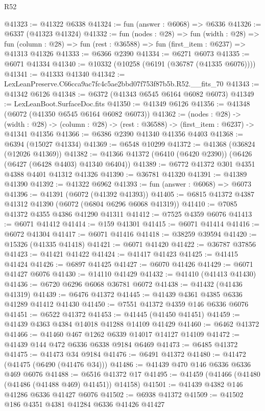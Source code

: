\begin{lexlean}{R52}
\begin{coremodule}
@41323 := @41322 @6338
@41324 := fun (answer : @6068) => @6336
@41326 := @6337 (@41323 @41324)
@41332 := fun (nodes : @28) =>
  fun (width : @28) =>
  fun (column : @28) => fun (rest : @36588) => fun (first_item : @6237) => @41313 @41326
@41333 := @6366 @2390
@41334 := @6271 @6073
@41335 := @6071 @41334
@41340 := @10332 (@10258 (@6191 (@36787 (@41335 @6076))))
@41341 := @41333 @41340
@41342 := LexLeanPreserve.C66cca9ac7fc4c5ae2bbd07f753f87b5b.R52.__fits_70
@41343 := @41342 @6126
@41348 := @6372 (@41343 @6545 @6164 @6082 @6073)
@41349 := LexLeanBoot.SurfaceDoc.fits
@41350 := @41349 @6126
@41356 := @41348 (@6072 (@41350 @6545 @6164 @6082 @6073))
@41362 := (nodes : @28) ->
  (width : @28) -> (column : @28) -> (rest : @36588) -> (first_item : @6237) -> @41341 @41356
@41366 := @6386 @2390 @41340 @41356 @4403
@41368 := @6394 (@15027 @41334)
@41369 := @6548 @10299
@41372 := @41368 (@36824 (@12026 @41369))
@41382 := @41366 @41372 (@6410 (@6420 @2390)) (@6426 (@6427 (@6428 @4403) @41340 @6404))
@41389 := @6772 @41372 @301 @4351 @4388 @4401 @41312 @41326
@41390 := @36781 @41320
@41391 := @41389 @41390
@41392 := @41322 @6962
@41393 := fun (answer : @6068) => @6073
@41396 := @41391 (@6072 (@41392 @41393))
@41405 := @6815 @41372 @4387 @41312 @41390 (@6072 (@6804 @6296 @6068 @41319))
@41410 := @7085 @41372 @4355 @4386 @41290 @41311
@41412 := @7525 @4359 @6076
@41413 := @6071 @41412
@41414 := @159 @41301
@41415 := @6071 @41414
@41416 := @6072 @41304
@41417 := @6071 @41416
@41418 := @38259 @39594
@41420 := @15326 (@41335 @41418)
@41421 := @6071 @41420
@41422 := @36787 @37856
@41423 := @41421 @41422
@41424 := @41417 @41423
@41425 := @41415 @41424
@41426 := @6897 @41425
@41427 := @6070 @41426
@41429 := @6071 @41427 @6076
@41430 := @14110 @41429
@41432 := @41410 (@41413 @41430)
@41436 := @6720 @6296 @6068 @36781 @6072
@41438 := @41432 (@41436 @41319)
@41439 := @6476 @41372
@41445 := @41439 @4361 @4385 @6336 @41289 @41412 @41430
@41450 := @7551 @41372 @4359 @146 @6336 @6076
@41451 := @6522 @41372
@41453 := @41445 (@41450 @41451)
@41459 := @41439 @4363 @4384 @14018 @41288 @14109 @41429
@41460 := @6462 @41372
@41466 := @41460 @467 @1262 @6339 @14017 @14127 @14109
@41472 := @41439 @144 @472 @6336 @6338 @9184 @6469
@41473 := @6485 @41372
@41475 := @41473 @34 @9184
@41476 := @6491 @41372
@41480 := @41472 (@41475 (@6490 (@41476 @34)))
@41486 := @41439 @470 @146 @6336 @6336 @469 @6076
@41488 := @6516 @41372 @17
@41495 := @41459 (@41466 (@41480 (@41486 (@41488 @469) @41451)) @14158)
@41501 := @41439 @4382 @146 @41286 @6336 @41427 @6076
@41502 := @6938 @41372
@41509 := @41502 @186 @4351 @4381 @41284 @6336 @41426 @41427

\end{coremodule}
\end{lexlean}
